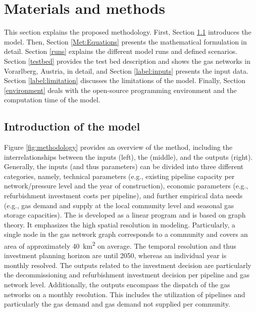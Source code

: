  \section{Materials and methods}\label{methodology}
 This section explains the proposed methodology. First, Section \ref{Met:Intro} introduces the model. Then, Section \ref{Met:Equations} presents the mathematical formulation in detail. Section \ref{runs} explains the different model runs and defined scenarios. Section \ref{testbed} provides the test bed description and shows the gas networks in Vorarlberg, Austria, in detail, and Section \ref{label:inputs} presents the input data. Section \ref{label:limitation} discusses the limitations of the model. Finally, Section \ref{environment} deals with the open-source programming environment and the computation time of the model. 
 
 \subsection{Introduction of the model}\label{Met:Intro}
 Figure \ref{fig:methodology} provides an overview of the method, including the interrelationships between the inputs (left), the  (middle), and the outputs (right). Generally, the inputs (and thus parameters) can be divided into three different categories, namely, technical parameters (e.g., existing pipeline capacity per network/pressure level and the year of construction), economic parameters (e.g., refurbishment investment costs per pipeline), and further empirical data needs (e.g., gas demand and supply at the local community level and seasonal gas storage capacities). The  is developed as a linear program and is based on graph theory. It emphasizes the high spatial resolution in modeling. Particularly, a single node in the gas network graph corresponds to a community and covers an area of approximately \SI{40}{km^2} on average. The temporal resolution and thus investment planning horizon are until 2050, whereas an individual year is monthly resolved.  The outputs related to the investment decision are particularly the decommissioning and refurbishment investment decision per pipeline and gas network level. Additionally, the outputs encompass the dispatch of the gas networks on a monthly resolution. This includes the utilization of pipelines and particularly the gas demand and gas demand not supplied per community. 
 
